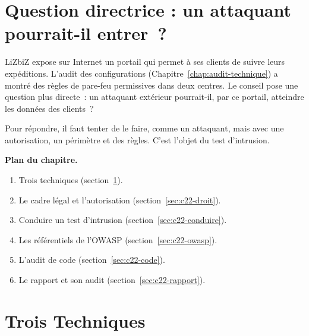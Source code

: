 \bigskip

\section*{Question directrice : un attaquant pourrait-il entrer~?}

LiZbiZ expose sur Internet un portail qui permet à ses clients de suivre
leurs expéditions. L'audit des configurations (Chapitre~\ref{chap:audit-technique})
a montré des règles de pare-feu permissives dans deux centres. Le conseil
pose une question plus directe~: un attaquant extérieur pourrait-il, par ce
portail, atteindre les données des clients~?

Pour répondre, il faut tenter de le faire, comme un attaquant, mais avec
une autorisation, un périmètre et des règles. C'est l'objet du test
d'intrusion.

\medskip
\textbf{Plan du chapitre.}
\begin{enumerate}
    \item Trois techniques (section~\ref{sec:c22-trois}).
    \item Le cadre légal et l'autorisation (section~\ref{sec:c22-droit}).
    \item Conduire un test d'intrusion (section~\ref{sec:c22-conduire}).
    \item Les référentiels de l'OWASP (section~\ref{sec:c22-owasp}).
    \item L'audit de code (section~\ref{sec:c22-code}).
    \item Le rapport et son audit (section~\ref{sec:c22-rapport}).
\end{enumerate}

\separateur

\section{Trois Techniques}
\label{sec:c22-trois}

